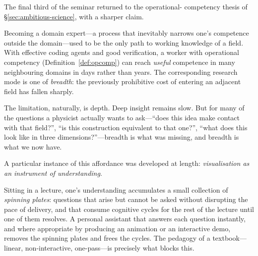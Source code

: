The final third of the seminar returned to the operational-
competency thesis of \S\ref{sec:ambitious-science}, with a
sharper claim.

\begin{keyresult}\label{kr:breadth}
  Becoming a domain expert---a process that inevitably
  narrows one's competence outside the domain---used to be
  the only path to working knowledge of a field.  With
  effective coding agents and good verification, a worker
  with operational competency
  (Definition~\ref{def:opcomp}) can reach \emph{useful}
  competence in many neighbouring domains in days rather
  than years.  The corresponding research mode is one of
  \emph{breadth}: the previously prohibitive cost of
  entering an adjacent field has fallen sharply.
\end{keyresult}

The limitation, naturally, is depth.  Deep insight remains
slow.  But for many of the questions a physicist actually
wants to ask---``does this idea make contact with that
field?'', ``is this construction equivalent to that one?'',
``what does this look like in three dimensions?''---breadth
is what was missing, and breadth is what we now have.

A particular instance of this affordance was developed at
length: \emph{visualisation as an instrument of
understanding}.

\begin{intuition}
  Sitting in a lecture, one's understanding accumulates a
  small collection of \emph{spinning plates}: questions
  that arise but cannot be asked without disrupting the
  pace of delivery, and that consume cognitive cycles for
  the rest of the lecture until one of them resolves.  A
  personal assistant that answers each question instantly,
  and where appropriate by producing an animation or an
  interactive demo, removes the spinning plates and frees
  the cycles.  The pedagogy of a textbook---linear,
  non-interactive, one-pass---is precisely what blocks
  this.
\end{intuition}

